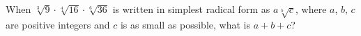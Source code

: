 When $\sqrt[3]{9}\cdot\sqrt[4]{16}\cdot\sqrt[6]{36}$ is written in simplest radical form as $a\sqrt[b]{c}$, where $a$, $b$, $c$ are positive integers and $c$ is as small as possible, what is $a+b+c$?
